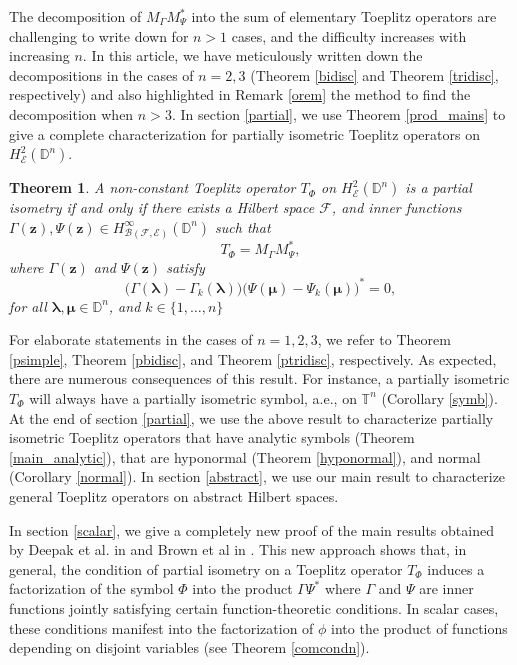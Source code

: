 \documentclass[12pt]{amsart}
\newtheorem{thm}[propn]{Theorem}
\theoremstyle{definition}
\newcommand{\D}{\mathbb{D}}
\newcommand{\1}{{\mbox{\bf 1}}}
\newcommand{\clb}{\mathcal{B}}
\newcommand{\cle}{\mathcal{E}}
\newcommand{\clf}{\mathcal{F}}
\begin{document}
The decomposition of $M_{\Gamma}M_{\Psi}^*$ into the sum of elementary Toeplitz operators are challenging to write down for $n>1$ cases, and the difficulty increases with increasing $n$.  In this article, we have meticulously written down the decompositions in the cases of $n=2,3$ (Theorem \ref{bidisc} and Theorem \ref{tridisc}, respectively) and also highlighted in Remark \ref{orem} the method to find the decomposition when $n>3$.  In section \ref{partial}, we use Theorem \ref{prod_mains} to give a complete characterization for partially isometric Toeplitz operators on $H_{\cle}^2(\D^n)$.
\begin{thm}\label{mainthm1}
A non-constant Toeplitz operator $T_{\Phi}$ on $H_{\cle}^2(\D^n)$ is a partial isometry if and only if there exists a Hilbert space $\clf$,  and inner functions $\Gamma(\bm{z}), \Psi(\bm{z}) \in H_{\clb(\clf, \cle)}^{\infty}(\D^n)$ such that 
\[
T_{\Phi} = M_{\Gamma} M_{\Psi}^*,
\]
where $\Gamma(\bm{z})$ and $\Psi(\bm{z})$ satisfy
\[
\big( \Gamma(\bm{\lambda}) - \Gamma_k(\bm{\lambda}) \big) \big( \Psi(\bm{\mu}) - \Psi_k(\bm{\mu})\big)^* = 0,
\]
for all $\bm{\lambda}, \bm{\mu} \in \D^n$, and $k \in \{1,\ldots,n\}$
\end{thm}
For elaborate statements in the cases of $n=1,2,3$, we refer to Theorem \ref{psimple}, Theorem \ref{pbidisc},  and Theorem \ref{ptridisc}, respectively. As expected, there are numerous consequences of this result. For instance, a partially isometric $T_{\Phi}$ will always have a partially isometric symbol, a.e., on $\mathbb{T}^n$ (Corollary \ref{symb}). At the end of section \ref{partial}, we use the above result to characterize partially isometric Toeplitz operators that have analytic symbols (Theorem \ref{main_analytic}), that are hyponormal (Theorem \ref{hyponormal}), and normal (Corollary \ref{normal}).  In section \ref{abstract}, we use our main result to characterize general Toeplitz operators on abstract Hilbert spaces.

In section \ref{scalar}, we give a completely new proof of the main results obtained by Deepak et al. in \cite[Theorem 1.1]{KPS} and Brown et al in \cite{BD}. \textsf{This new approach shows that, in general, the condition of partial isometry on a Toeplitz operator $T_{\Phi}$ induces a factorization of the symbol $\Phi$ into the product $\Gamma \Psi^*$ where $\Gamma$ and $\Psi$ are inner functions jointly satisfying certain function-theoretic conditions. In scalar cases, these conditions manifest into the factorization of $\phi$ into the product of functions depending on disjoint variables (see Theorem \ref{comcondn}).}
\end{document}
